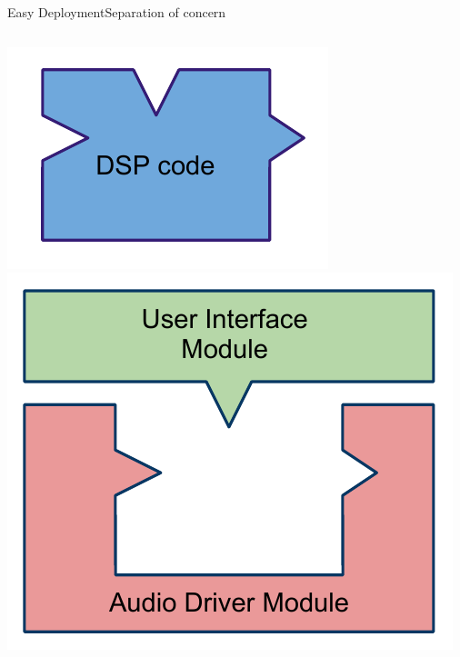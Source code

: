 \begin{frame}{Easy Deployment}{Separation of concern}
\begin{columns}[t]
\begin{column}{0.75\textwidth}
        \begin{center}
        \includegraphics[height=0.2\textheight]{images/FaustArchitectureDSPCode}
        \hspace{1cm}
        \includegraphics[height=0.2\textheight]{images/FaustArchitectureModules}
        \end{center}
    

\end{column}
\end{columns}
\end{frame}
